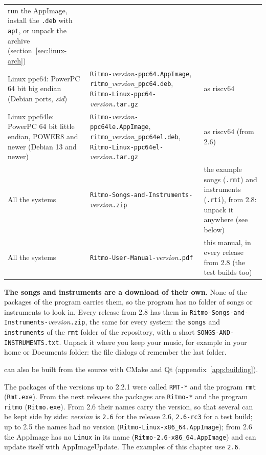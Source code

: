 \begin{center}
\begin{tabular}{@{}>{\raggedright\arraybackslash}p{3.0cm}>{\raggedright\arraybackslash}p{4.6cm}>{\raggedright\arraybackslash}p{6.2cm}@{}}
  run the AppImage, install the \texttt{.deb} with \texttt{apt}, or unpack the archive (section~\ref{sec:linux-arch}) \\
Linux ppc64: PowerPC 64 bit big endian (Debian ports, \emph{sid}) & \texttt{Ritmo-}\emph{version}\texttt{-\allowbreak ppc64.AppImage}, \texttt{ritmo\_}\emph{version}\texttt{\_ppc64.deb}, \texttt{Ritmo-Linux-\allowbreak ppc64-}\emph{version}\texttt{.tar.gz} &
  as riscv64 \\
Linux ppc64le: PowerPC 64 bit little endian, POWER8 and newer (Debian 13 and newer) & \texttt{Ritmo-}\emph{version}\texttt{-\allowbreak ppc64le.AppImage}, \texttt{ritmo\_}\emph{version}\texttt{\_ppc64el.deb}, \texttt{Ritmo-Linux-\allowbreak ppc64el-}\emph{version}\texttt{.tar.gz} &
  as riscv64 (from 2.6) \\
All the systems & \texttt{Ritmo-Songs-and-\allowbreak Instruments-}\emph{version}\texttt{.zip} &
  the example songs (\texttt{.rmt}) and instruments (\texttt{.rti}), from 2.8: unpack it anywhere (see below) \\
All the systems & \texttt{Ritmo-User-\allowbreak Manual-}\emph{version}\texttt{.pdf} &
  this manual, in every release from 2.8 (the test builds too) \\
\bottomrule
\end{tabular}
\end{center}

\begin{note}
\textbf{The songs and instruments are a download of their own.} None of the packages of the program carries them, so the program has
no folder of songs or instruments to look in. Every release from 2.8 has them in \texttt{Ritmo-Songs-and-Instruments-}\emph{version}\texttt{.zip},
the same for every system: the \texttt{songs} and \texttt{instruments} of the \texttt{rmt} folder of the repository, with a short
\texttt{SONGS-AND-INSTRUMENTS.txt}. Unpack it where you keep your music, for example in your home or Documents folder: the file
dialogs of \RITMO{} remember the last folder.
\end{note}

\RITMO{} can also be built from the source with CMake and Qt (appendix~\ref{app:building}).

\begin{note}
The packages of the versions up to 2.2.1 were called \texttt{RMT-*} and the program \texttt{rmt}
(\texttt{Rmt.exe}). From the next releases the packages are \texttt{Ritmo-*} and the program
\texttt{ritmo} (\texttt{Ritmo.exe}). From 2.6 their names carry the version, so that several can be kept side by side:
\emph{version} is \texttt{2.6} for the release 2.6, \texttt{2.6-rc3} for a test build; up to 2.5 the names had no
version (\texttt{Ritmo-Linux-x86\_64.AppImage}); from 2.6 the AppImage has no \texttt{Linux} in its name
(\texttt{Ritmo-2.6-x86\_64.AppImage}) and can update itself with AppImageUpdate. The examples of this chapter use \texttt{2.6}.
\end{note}

